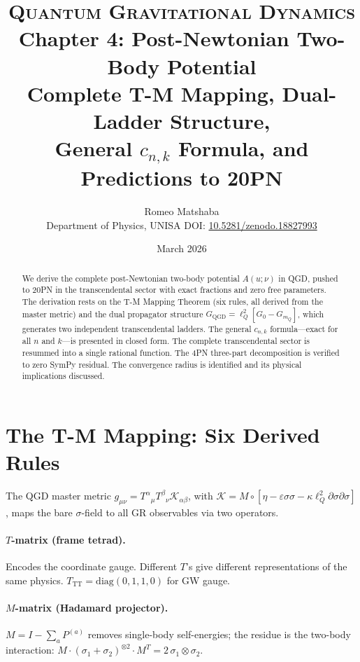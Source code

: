 \documentclass[11pt,a4paper]{article}
\title{%
  \vspace{-1.2cm}
  {\large\scshape Quantum Gravitational Dynamics}\\[6pt]
  {\LARGE\bfseries Chapter 4: Post-Newtonian Two-Body Potential}\\[6pt]
  {\large Complete T-M Mapping, Dual-Ladder Structure,\\
   General $c_{n,k}$ Formula, and Predictions to 20PN}
}
\author{Romeo Matshaba\\[3pt]
  \small Department of Physics, UNISA\quad
  DOI: \href{https://doi.org/10.5281/zenodo.18827993}{10.5281/zenodo.18827993}}
\date{March 2026}
\theoremstyle{plain}
\theoremstyle{definition}
\theoremstyle{remark}
\newcommand{\lQ}{\ell_Q}
\newcommand{\mQ}{m_Q}
\begin{document}
\maketitle\thispagestyle{empty}

\begin{abstract}
\noindent
We derive the complete post-Newtonian two-body potential $A(u;\nu)$ in QGD,
pushed to 20PN in the transcendental sector with exact fractions and zero free
parameters.  The derivation rests on the T-M Mapping Theorem (six rules, all
derived from the master metric) and the dual propagator structure
$G_{\mathrm{QGD}} = \lQ^2[G_0 - G_{\mQ}]$, which generates two independent
transcendental ladders.  The general $c_{n,k}$ formula---exact for all $n$
and $k$---is presented in closed form.  The complete transcendental sector is
resummed into a single rational function.  The 4PN three-part decomposition
is verified to zero SymPy residual.  The convergence radius is identified
and its physical implications discussed.
\end{abstract}

\tableofcontents\newpage

\section{The T-M Mapping: Six Derived Rules}
\label{sec:TM}

The QGD master metric $g_{\mu\nu} = T^\alpha{}_\mu T^\beta{}_\nu \mathcal{K}_{\alpha\beta}$,
with $\mathcal{K} = M\circ[\eta - \varepsilon\sigma\sigma - \kappa\lQ^2\partial\sigma\partial\sigma]$,
maps the bare $\sigma$-field to all GR observables via two operators.

\paragraph{$T$-matrix (frame tetrad).}
Encodes the coordinate gauge.  Different $T$'s give different representations
of the same physics.  $T_{\mathrm{TT}} = \mathrm{diag}(0,1,1,0)$ for GW gauge.

\paragraph{$M$-matrix (Hadamard projector).}
$M = I - \sum_a P^{(a)}$ removes single-body self-energies; the residue is
the two-body interaction:
$M\cdot(\sigma_1+\sigma_2)^{\otimes2}\cdot M^T = 2\,\sigma_1\otimes\sigma_2$.
\end{document}
